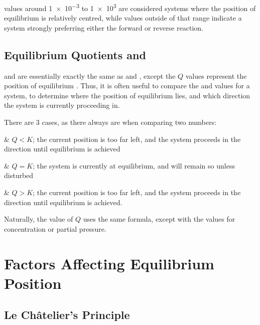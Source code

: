 			\Kc{} values around \num{1e-3} to \num{1e3} are considered systems where the position of equilibrium is relatively centred,
			while values outside of that range indicate a system strongly preferring either the forward or reverse reaction.



		\subsection{Equilibrium Quotients \texorpdfstring{}{Qc} and \texorpdfstring{}{Qp}}

			\Qc{} and \Qp{} are essentially exactly the same as \Kc{} and \Kp{}, except the $Q$ values represent the position of equilibrium
			. Thus, it is often useful to compare the \Qc{} and \Kc{} values for a system, to determine
			where the  position of equilibrium lies, and which direction the system is currently proceeding in.

			There are 3 cases, as there always are when comparing two numbers:

			\begin{bulletlist}
				& $Q < K$; the current position is too far left, and the system proceeds in the  direction until equilibrium
				is achieved

				& $Q = K$; the system is currently at equilibrium, and will remain so unless disturbed

				& $Q > K$; the current position is too far left, and the system proceeds in the  direction until equilibrium
				is achieved.
			\end{bulletlist}

			Naturally, the value of $Q$ uses the same formula, except with the  values for concentration or partial
			pressure.





	\pagebreak
	\section{Factors Affecting Equilibrium Position}

		\subsection{Le Châtelier's Principle}

